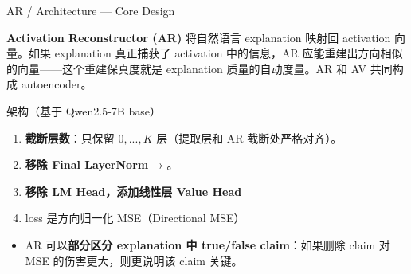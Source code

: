 % 


\begin{frame}{AR / Architecture — Core Design}
\small

\textbf{Activation Reconstructor (AR)} 将自然语言 explanation 映射回 activation 向量。如果 explanation 真正捕获了 activation 中的信息，AR 应能重建出方向相似的向量——这个重建保真度就是 explanation 质量的自动度量。AR 和 AV 共同构成 autoencoder。

\begin{block}{架构（基于 Qwen2.5-7B base）}
\begin{enumerate}
  \item \textbf{截断层数}：只保留 $0,...,K$ 层（提取层和 AR 截断处严格对齐）。
  \item \textbf{移除 Final LayerNorm} → 。
  \item \textbf{移除 LM Head，添加线性层 Value Head}
  \item loss 是方向归一化 MSE（Directional MSE）
\end{enumerate}
\end{block}

\vspace{0.4em}
\begin{itemize}
  \item AR 可以\textbf{部分区分 explanation 中 true/false claim}：如果删除 claim 对 MSE 的伤害更大，则更说明该 claim 关键。
\end{itemize}
\end{frame}


